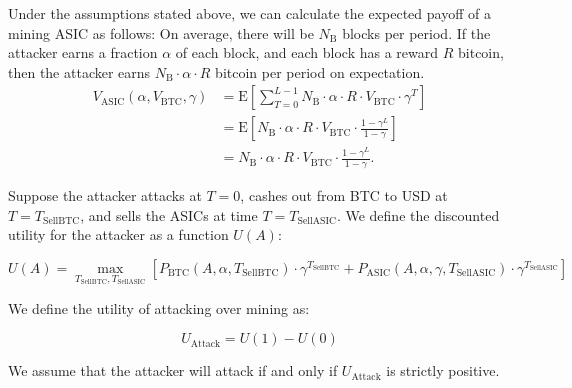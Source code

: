 \documentclass[12pt]{article}
\newcommand*{\Attack}{A}
\newcommand*{\Time}{T}
\newcommand*{\BlkReward}{{R}}
\newcommand*{\ExchgRate}{{V_{\mathrm{BTC}}}}
\newcommand*{\AsicValue}{{V_{\mathrm{ASIC}}}}
\newcommand*{\TimeCashOut}{{T_{\mathrm{SellBTC}}}}
\newcommand*{\TimeSellAsics}{{T_{\mathrm{SellASIC}}}}
\newcommand*{\Utility}{U}
\newcommand*{\AttackUtility}{{U_{\mathrm{Attack}}}}
\newcommand*{\PayoffBtc}{{P_{\mathrm{BTC}}}}
\newcommand*{\PayoffAsic}{{P_{\mathrm{ASIC}}}}
\newcommand*{\BlocksPerPeriod}{{N_{\mathrm{B}}}}
\newcommand*{\E}[1]{\mathrm{E}\left[#1\right]}
\begin{document}
Under the assumptions stated above, we can calculate the expected payoff of a mining ASIC as follows:
On average, there will be $\BlocksPerPeriod$ blocks per period.
If the attacker earns a fraction $\alpha$ of each block, and each block has a reward $\BlkReward$ bitcoin,
then the attacker earns $\BlocksPerPeriod \cdot \alpha \cdot \BlkReward$ bitcoin
per period on expectation.
\begin{align*}
  \AsicValue(\alpha, \ExchgRate, \gamma)
  & = \E{\sum_{\Time=0}^{L-1} \BlocksPerPeriod \cdot \alpha \cdot \BlkReward \cdot \ExchgRate \cdot \gamma^\Time} \\
  & = \E{\BlocksPerPeriod \cdot \alpha \cdot \BlkReward \cdot \ExchgRate \cdot \frac{1 - \gamma^L}{1 - \gamma}} \\
  & = \BlocksPerPeriod \cdot \alpha \cdot \BlkReward \cdot \ExchgRate \cdot \frac{1 - \gamma^L}{1 - \gamma}.
\end{align*}

Suppose the attacker attacks at $\Time = 0$, cashes out from BTC to USD at
$\Time = \TimeCashOut$, and sells the ASICs at time $\Time = \TimeSellAsics$.
We define the discounted utility for the attacker as a function
$\Utility(\Attack)$:

\[
  \Utility(\Attack) =
  \max_{\TimeCashOut, \TimeSellAsics}
    \left[
        \PayoffBtc(\Attack, \alpha, \TimeCashOut)
          \cdot \gamma^\TimeCashOut
        + \PayoffAsic(\Attack, \alpha, \gamma, \TimeSellAsics)
          \cdot \gamma^\TimeSellAsics
    \right]
\]

We define the utility of attacking over mining as:

\[
  \AttackUtility = \Utility(1) - \Utility(0)
\]

We assume that the attacker will attack if and only if $\AttackUtility$ is
strictly positive.
\end{document}
